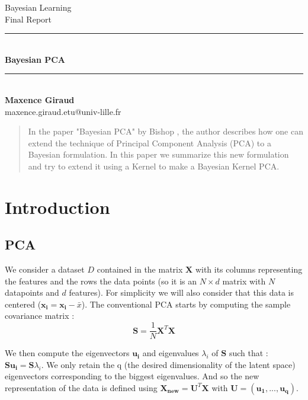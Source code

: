 \documentclass{article}
\newcommand{\HRule}{\rule{\linewidth}{0.2mm}}
\begin{document}
\begin{minipage}{\textwidth}
    \begin{center}
        \Large Bayesian Learning\\
        \large Final Report\\
        \HRule\\
        \vspace{0.3cm}
        {\huge \textbf{Bayesian PCA}}\\
        \HRule\\
        \vspace{1em}
            \textbf{Maxence Giraud}\\
            maxence.giraud.etu@univ-lille.fr\\
    \end{center}
\end{minipage}

\begin{abstract}
    In the paper "Bayesian PCA" by Bishop \cite{bishop1999bayesian}, the author describes how one can extend the technique of Principal Component Analysis (PCA) to a Bayesian formulation. In this paper we summarize this new formulation and try to extend it using a Kernel to make a Bayesian Kernel PCA.
\end{abstract}


\section{Introduction}

\subsection{PCA}
We consider a dataset $D$ contained in the matrix $\mathbf{X}$ with its columns representing the features and the rows the data points (so it is an $N \times d$ matrix with $N$ datapoints and $d$ features). For simplicity we will also consider that this data is centered ($\mathbf{x_i} = \mathbf{x_i} - \bar x$).
The conventional PCA starts by computing the sample covariance matrix : 
\begin{equation}
    \mathbf{S} = \dfrac{1}{N} \mathbf{X}^T \mathbf{X} 
    \label{sample_cov}
\end{equation}


We then compute the eigenvectors $\mathbf{u_i}$ and eigenvalues $\lambda_i$ of $\mathbf{S}$ such that : $\mathbf{S}\mathbf{u_i} =\mathbf{S}\lambda_i $.  We only retain the q (the desired dimensionality of the latent space) eigenvectors corresponding to the biggest eigenvalues. And so the new representation of the data is defined using $\mathbf{X_{new}} = \mathbf{U}^T \mathbf{X}$ with $\mathbf{U} = (\mathbf{u_1},...,\mathbf{u_q})$.
\end{document}
